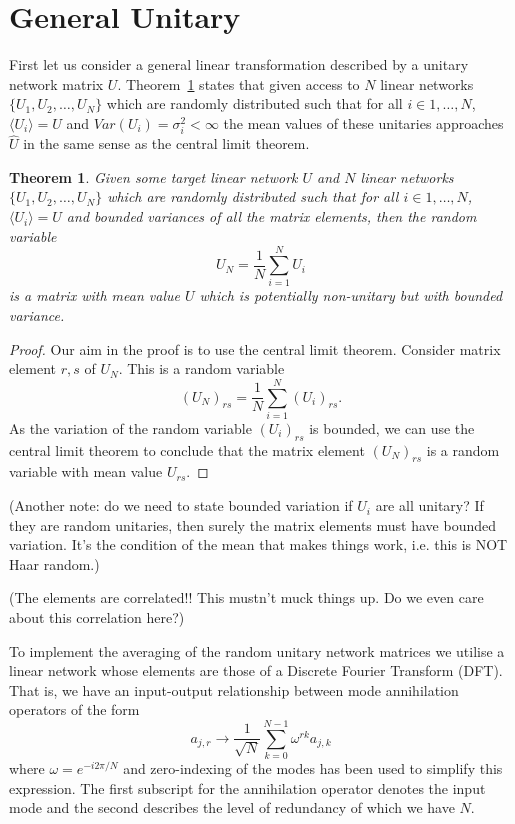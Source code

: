 \documentclass[aps,pra,twocolumn,superscriptaddress,numerical]{revtex4-1}
\newtheorem{theorem}{Theorem}
\begin{document}
\section{General Unitary\label{gen case}}
First let us consider a general linear transformation described by a unitary network matrix $U$. Theorem~\ref{Theorem 1} states that given access to $N$ linear networks $\{U_1,U_2,\ldots,U_N\}$ which are randomly distributed such that for all $i \in {1,\ldots,N}$, $\langle U_i \rangle = U$ and $Var(U_i) = \sigma_i^2 < \infty$  the mean values of these unitaries approaches $\hat{U}$ in the same sense as the central limit theorem.

\begin{theorem}
\label{Theorem 1}
Given some target linear network $U$ and $N$ linear networks $\{U_1,U_2,\ldots,U_N\}$ which are randomly distributed such that for all $i \in {1,\ldots,N}$, $\langle U_i \rangle = U$ and bounded variances of all the matrix elements, then the random variable 
\begin{equation}
	\label{sum_unitary}
	U_{N}=\frac{1}{N}\sum_{i=1}^{N}U_{i}
\end{equation}
is a matrix with mean value $U$ which is potentially non-unitary but with bounded variance.
\end{theorem}

\begin{proof}\label{Proof 1}
Our aim in the proof is to use the central limit theorem.  Consider matrix element $r,s$ of $U_N$.  This is a random variable
\begin{equation}
	\left(U_N\right)_{rs} = \frac{1}{N} \sum_{i=1}^N \left(U_i\right)_{rs}.
\end{equation}
As the variation of the random variable $\left(U_i\right)_{rs}$ is bounded, we can use the central limit theorem to conclude that the matrix element $\left(U_N\right)_{rs}$ is a random variable with mean value $U_{rs}$.
\end{proof}
(Another note: do we need to state bounded variation if $U_i$ are all unitary? If they are random unitaries, then surely the matrix elements must have bounded variation.  It's the condition of the mean that makes things work, i.e. this is NOT Haar random.)

(The elements are correlated!!  This mustn't muck things up.  Do we even care about this correlation here?)

To implement the averaging of the random unitary network matrices we utilise a linear network whose elements are those of a Discrete Fourier Transform (DFT).  That is, we have an input-output relationship between mode annihilation operators of the form
\begin{equation}
	a_{j,r} \rightarrow \frac{1}{\sqrt{N}} \sum_{k=0}^{N-1} \omega^{rk} a_{j,k}	
\end{equation}
where $\omega = e^{-i2\pi /N}$ and zero-indexing of the modes has been used to simplify this expression.  The first subscript for the annihilation operator denotes the input mode and the second describes the level of redundancy of which we have $N$.
\end{document}
